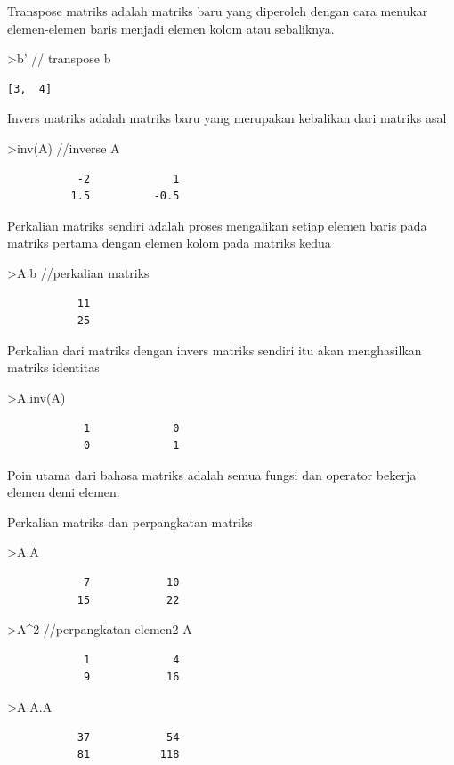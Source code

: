 \documentclass[
]{book}
\begin{document}
Transpose matriks adalah matriks baru yang diperoleh dengan cara menukar elemen-elemen baris menjadi elemen kolom atau sebaliknya.

\textgreater b' // transpose b

\begin{verbatim}
[3,  4]
\end{verbatim}

Invers matriks adalah matriks baru yang merupakan kebalikan dari matriks asal

\textgreater inv(A) //inverse A

\begin{verbatim}
           -2             1 
          1.5          -0.5 
\end{verbatim}

Perkalian matriks sendiri adalah proses mengalikan setiap elemen baris pada matriks pertama dengan elemen kolom pada matriks kedua

\textgreater A.b //perkalian matriks

\begin{verbatim}
           11 
           25 
\end{verbatim}

Perkalian dari matriks dengan invers matriks sendiri itu akan menghasilkan matriks identitas

\textgreater A.inv(A)

\begin{verbatim}
            1             0 
            0             1 
\end{verbatim}

Poin utama dari bahasa matriks adalah semua fungsi dan operator bekerja elemen demi elemen.

Perkalian matriks dan perpangkatan matriks

\textgreater A.A

\begin{verbatim}
            7            10 
           15            22 
\end{verbatim}

\textgreater A\^{}2 //perpangkatan elemen2 A

\begin{verbatim}
            1             4 
            9            16 
\end{verbatim}

\textgreater A.A.A

\begin{verbatim}
           37            54 
           81           118 
\end{verbatim}
\end{document}
